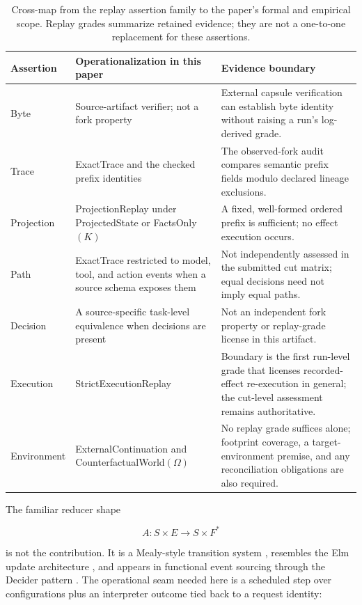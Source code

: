 \begin{table}[ht]
\centering
\small
\begin{tabularx}{\textwidth}{@{}P{0.14\textwidth}P{0.34\textwidth}Y@{}}
\toprule
Assertion & Operationalization in this paper & Evidence boundary \\
\midrule
Byte & Source-artifact verifier; not a fork property & External capsule verification can establish byte identity without raising a run's log-derived grade. \\
Trace & ExactTrace and the checked prefix identities & The observed-fork audit compares semantic prefix fields modulo declared lineage exclusions. \\
Projection & ProjectionReplay under ProjectedState or FactsOnly$(K)$ & A fixed, well-formed ordered prefix is sufficient; no effect execution occurs. \\
Path & ExactTrace restricted to model, tool, and action events when a source schema exposes them & Not independently assessed in the submitted cut matrix; equal decisions need not imply equal paths. \\
Decision & A source-specific task-level equivalence when decisions are present & Not an independent fork property or replay-grade license in this artifact. \\
Execution & StrictExecutionReplay & Boundary is the first run-level grade that licenses recorded-effect re-execution in general; the cut-level assessment remains authoritative. \\
Environment & ExternalContinuation and CounterfactualWorld$(\Omega)$ & No replay grade suffices alone; footprint coverage, a target-environment premise, and any reconciliation obligations are also required. \\
\bottomrule
\end{tabularx}
\caption{Cross-map from the replay assertion family to the paper's formal and
empirical scope.  Replay grades summarize retained evidence; they are not a
one-to-one replacement for these assertions.}
\label{tab:assertion-map}
\end{table}

The familiar reducer shape

\begin{equation}
  A : S \times E \rightarrow S \times F^*
\end{equation}

is not the contribution.  It is a Mealy-style transition system
\cite{mealy1955method}, resembles the Elm update architecture
\cite{elmarchitecture}, and appears in functional event sourcing through the
Decider pattern \cite{chassaing2021decider}.  The operational seam needed here
is a scheduled step over configurations plus an interpreter outcome tied back
to a request identity:


